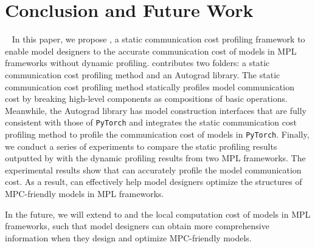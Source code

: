 \section{Conclusion and Future Work}~\label{sec:conclu}
In this paper, we propose \hawkeye, a static communication cost profiling framework to enable model designers to  the accurate communication cost of models in MPL frameworks without dynamic profiling. \hawkeye contributes two folders: a static communication cost profiling method and an Autograd library. The static communication cost profiling method statically profiles model communication cost by breaking high-level components as compositions of basic operations. Meanwhile, the Autograd library has model construction interfaces that are fully consistent with those of \texttt{PyTorch} and integrates the static communication cost profiling method to profile the communication cost of models in \texttt{PyTorch}. Finally, we conduct a series of experiments to compare the static profiling results outputted by \hawkeye with the dynamic profiling results from two MPL frameworks. The experimental results show that \hawkeye can accurately profile the model communication cost. As a result, \hawkeye can effectively help model designers optimize the structures of MPC-friendly models in MPL frameworks.

In the future,  we will extend \hawkeye to  and the local computation cost of models in MPL frameworks, such that model designers can obtain more comprehensive information when they design and optimize MPC-friendly models.
